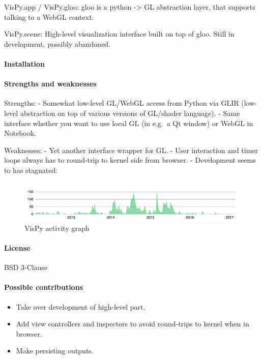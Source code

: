 VisPy.app / VisPy.gloo: gloo is a python -\textgreater{} GL abstraction
layer, that supports talking to a WebGL context.

VisPy.scene: High-level visualization interface built on top of gloo.
Still in development, possibly abandoned.

\hypertarget{installation}{%
\paragraph{Installation}\label{installation}}

\hypertarget{strengths-and-weaknesses}{%
\paragraph{Strengths and
weaknesses}\label{strengths-and-weaknesses}}

Strengths: - Somewhat low-level GL/WebGL access from Python via GLIR
(low-level abstraction on top of various versions of GL/shader
language). - Same interface whether you want to use local GL (in e.g.~a
Qt window) or WebGL in Notebook.

Weaknesses: - Yet another interface wrapper for GL. - User interaction
and timer loops always has to round-trip to kernel side from browser. -
Development seems to has stagnated:

\begin{figure}
\centering
\includegraphics[width=0.6\paperwidth]{existing_tools/vispy_activity.pdf}
\caption{VisPy activity graph}
\end{figure}

\hypertarget{license}{%
\paragraph{License}\label{license}}

BSD 3-Clause

\hypertarget{possible-contributions}{%
\paragraph{Possible contributions}\label{possible-contributions}}

\begin{itemize}
\tightlist
\item
  Take over development of high-level part.
\item
  Add view controllers and inspectors to avoid round-trips to kernel
  when in browser.
\item
  Make persisting outputs.
\end{itemize}

